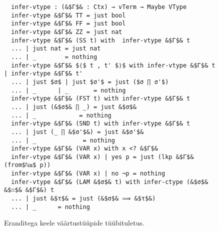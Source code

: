 \documentclass[a4paper,12pt]{article}
\begin{document}
\begin{figure}
  \begin{lstlisting}
  infer-vtype : (&$Γ$& : Ctx) → vTerm → Maybe VType
  infer-vtype &$Γ$& TT = just bool
  infer-vtype &$Γ$& FF = just bool
  infer-vtype &$Γ$& ZZ = just nat
  infer-vtype &$Γ$& (SS t) with  infer-vtype &$Γ$& t
  ... | just nat = just nat
  ... | _        = nothing
  infer-vtype &$Γ$& $⟨$ t , t' $⟩$ with infer-vtype &$Γ$& t | infer-vtype &$Γ$& t'
  ... | just $σ$ | just $σ'$ = just ($σ ∏ σ'$)
  ... | _      | _       = nothing
  infer-vtype &$Γ$& (FST t) with infer-vtype &$Γ$& t
  ... | just (&$σ$& ∏ _) = just &$σ$&
  ... | _            = nothing
  infer-vtype &$Γ$& (SND t) with infer-vtype &$Γ$& t
  ... | just (_ ∏ &$σ'$&) = just &$σ'$&
  ... | _             = nothing
  infer-vtype &$Γ$& (VAR x) with x <? &$Γ$&
  infer-vtype &$Γ$& (VAR x) | yes p = just (lkp &$Γ$& (from$ℕ≤$ p))
  infer-vtype &$Γ$& (VAR x) | no ¬p = nothing
  infer-vtype &$Γ$& (LAM &$σ$& t) with infer-ctype (&$σ$& &$∷$& &$Γ$&) t
  ... | just &$τ$& = just (&$σ$& ⟹ &$τ$&)
  ... | _      = nothing
  \end{lstlisting}
  \caption{Eranditega keele väärtustüüpide tüübituletus.}
  \label{fig:exc.infer-vtype}
\end{figure}
\end{document}
